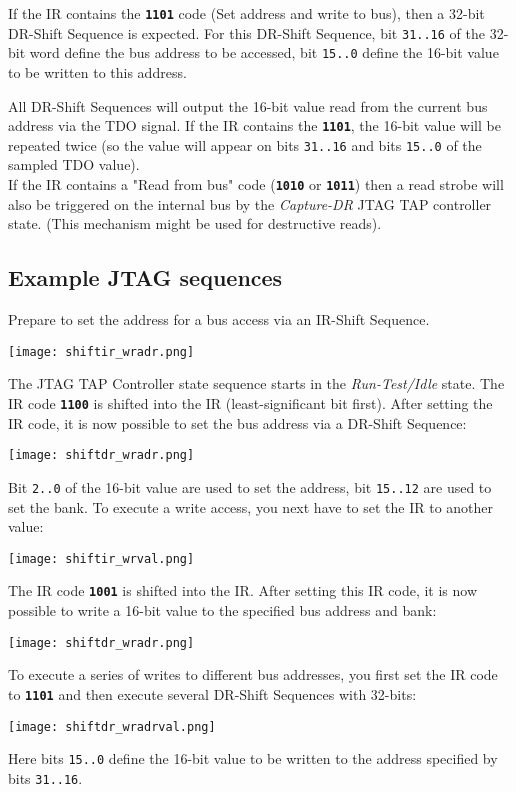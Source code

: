 \documentclass[10pt,english,a4paper]{report}
\begin{document}
If the IR contains the {\tt\bf 1101} code (Set address and write to bus), then a 32-bit
DR-Shift Sequence is expected. For this DR-Shift Sequence, bit {\tt 31..16} of the 32-bit word
define the bus address to be accessed, bit {\tt 15..0} define the 16-bit value to be written
to this address.

All DR-Shift Sequences will output the 16-bit value read from the current bus address via the TDO signal.
If the IR contains the {\tt\bf 1101}, the 16-bit value will be repeated twice (so the value will
appear on bits {\tt 31..16} and bits {\tt 15..0} of the sampled TDO value).\\
If the IR contains a "Read from bus" code ({\tt\bf 1010} or {\tt\bf 1011}) then
a read strobe will also be triggered on the internal bus by the {\em Capture-DR} JTAG TAP controller state.
(This mechanism might be used for destructive reads).



\newpage
\subsection{Example JTAG sequences}
Prepare to set the address for a bus access via an IR-Shift Sequence.
\begin{center}
	\texttt{[image: shiftir\_wradr.png]}
\end{center}
The JTAG TAP Controller state sequence starts in the {\em Run-Test/Idle} state.
The IR code {\tt\bf 1100} is shifted into the IR (least-significant bit first).
After setting the IR code, it is now possible to set the bus address via a DR-Shift Sequence:\\
\begin{center}
	\texttt{[image: shiftdr\_wradr.png]}
\end{center}
Bit {\tt 2..0} of the 16-bit value are used to set the address, bit {\tt 15..12} are used
to set the bank. To execute a write access, you next have to set the IR to another value:
\begin{center}
	\texttt{[image: shiftir\_wrval.png]}
\end{center}
The IR code {\tt\bf 1001} is shifted into the IR.
After setting this IR code, it is now possible to write a 16-bit value to
the specified bus address and bank:
\begin{center}
	\texttt{[image: shiftdr\_wradr.png]}
\end{center}
To execute a series of writes to different bus addresses,
you first set the IR code to {\tt\bf 1101} and then execute
several DR-Shift Sequences with 32-bits:
\begin{center}
	\texttt{[image: shiftdr\_wradrval.png]}
\end{center}
Here bits {\tt 15..0} define the 16-bit value to be written to the address
specified by bits {\tt 31..16}.
\end{document}
